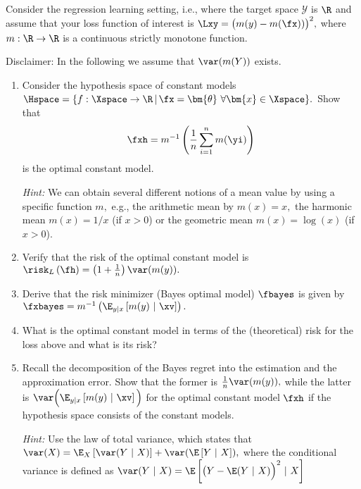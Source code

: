 


Consider the regression learning setting, i.e., where the target space $\mathcal{Y}$ is $\R$
and assume that your loss function of interest is $\Lxy= \big(m(y)-m(\fx))\big)^2,$ where $m:\R \to \R$ is a continuous strictly monotone function.
%

Disclaimer: In the following we assume that $ \var(m(Y))$ exists.
%
\begin{enumerate}
	\item Consider the hypothesis space of constant models 
	$\Hspace = \{ f:\Xspace \to \R \, | \,  \fx = \bm{\theta}  \ \forall \bm{x} \in \Xspace  \}.$
	Show that 
	$$\fxh = m^{-1}\left(  \frac1n \sum_{i=1}^n m(\yi)  \right)$$
	is the optimal constant model.
	
	\emph{Hint:} We can obtain several different notions of a mean value by using a specific function $m,$ e.g., the arithmetic mean by $m(x)=x,$ the harmonic mean $m(x)=1/x$ (if $x>0$) or the geometric mean $m(x)=\log(x)$ (if $x>0$).
	
	\item Verify that the risk of the optimal constant model is $\risk_L\left(\fh \right) = \left( 1 + \frac1n \right) \var(m(y)).$
	\item Derive that the risk minimizer (Bayes optimal model) $\fbayes$ is given by $\fxbayes=m^{-1} \left(  \E_{y|x}\left[ m(y) ~|~ \xv \right] \right).$
	\item What is the optimal constant model in terms of the (theoretical) risk for the loss above and what is its risk?
	\item Recall the decomposition of the Bayes regret into the estimation and the approximation error.
	Show that the former is $\frac1n \var(m(y)),$ while the latter is $\var\Big(  \E_{y|x}\left[ m(y) ~|~ \xv \right] \Big)$ for the optimal constant model $\fxh$ if the hypothesis space consists of the constant models. 
	
	\emph{Hint:} Use the law of total variance, which states that $ \var(X) = \E_X\left[\var(Y~|~X)\right] + \var(  \E \left[ Y ~|~ X \right] ),$ where the conditional variance is defined as $\var(Y~|~X) = \E \left[  \big(Y - \E(Y ~|~X)\Big)^2 ~|~X \right] $
  
\end{enumerate}
  
